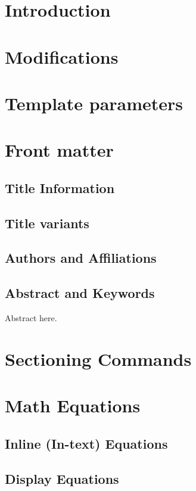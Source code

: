 \documentclass[
twocolumn,
]{ceurart}
\begin{document}
\section{Introduction}

\section{Modifications}

\section{Template parameters}

\section{Front matter}

\subsection{Title Information}

\subsection{Title variants}

\subsection{Authors and Affiliations}

\subsection{Abstract and Keywords}

Abstract here.

\section{Sectioning Commands}

\section{Math Equations}

\subsection{Inline (In-text) Equations}

\subsection{Display Equations}
\end{document}
